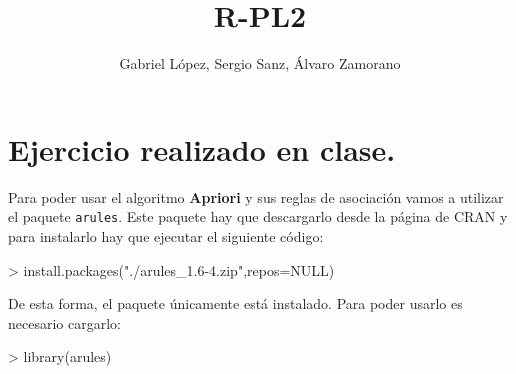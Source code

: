 \documentclass [a4paper] {article}
\title{R-PL2}
\author{Gabriel López, Sergio Sanz, Álvaro Zamorano}
\begin{document}
\maketitle

\graphicspath{ {./tmp/} }

\section{Ejercicio realizado en clase.}
Para poder usar el algoritmo \textbf{Apriori} y sus reglas de asociación vamos a utilizar el paquete
\texttt{arules}. Este paquete hay que descargarlo desde la página de CRAN y para instalarlo hay que
ejecutar el siguiente código:

\begin{Schunk}
\begin{Sinput}
> install.packages("./arules_1.6-4.zip",repos=NULL)
\end{Sinput}
\end{Schunk}

\bigskip
De esta forma, el paquete únicamente está instalado. Para poder usarlo es necesario cargarlo:
\begin{Schunk}
\begin{Sinput}
> library(arules)
\end{Sinput}
\end{Schunk}
\end{document}
